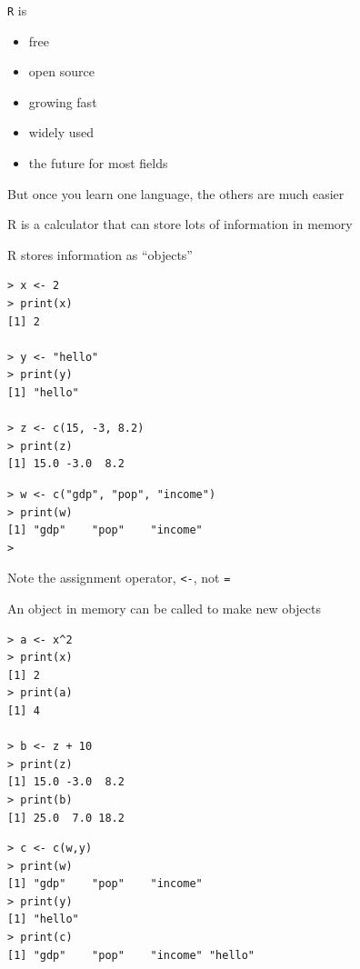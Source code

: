 \documentclass[pdflatex,landscape,titlepage]{foils}
\begin{document}
\bgclear

\texttt{R} is 

\begin{itemize}
\item free

\item open source 

\item growing fast

\item widely used

\item the future for most fields
\end{itemize}

But once you learn one language, the others are much easier

\bgclear

R is a calculator that can store lots of information in memory

R stores information as ``objects''

\begin{verbatim}
> x <- 2
> print(x)
[1] 2

> y <- "hello"
> print(y)
[1] "hello"

> z <- c(15, -3, 8.2)
> print(z)
[1] 15.0 -3.0  8.2
\end{verbatim}

\bgclear

\begin{verbatim}
> w <- c("gdp", "pop", "income")
> print(w)
[1] "gdp"    "pop"    "income"
> 
\end{verbatim}

Note the assignment operator, \texttt{<-}, not \texttt{=}

An object in memory can be called to make new objects

\begin{verbatim}
> a <- x^2
> print(x)
[1] 2
> print(a)
[1] 4

> b <- z + 10
> print(z)
[1] 15.0 -3.0  8.2
> print(b)
[1] 25.0  7.0 18.2
\end{verbatim}

\bgclear

\begin{verbatim}
> c <- c(w,y)
> print(w)
[1] "gdp"    "pop"    "income"
> print(y)
[1] "hello"
> print(c)
[1] "gdp"    "pop"    "income" "hello" 
\end{verbatim}
\end{document}
